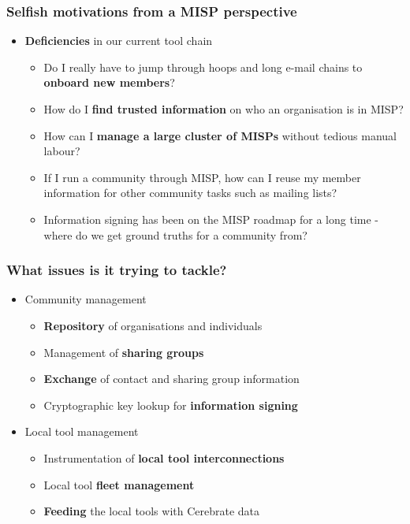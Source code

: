 \begin{frame}
	\frametitle{Selfish motivations from a MISP perspective}
	\begin{itemize}
            \item {\bf Deficiencies} in our current tool chain
            \begin{itemize}
                \item Do I really have to jump through hoops and long e-mail chains to {\bf onboard new members}?
                \item How do I {\bf find trusted information} on who an organisation is in MISP?
                \item How can I {\bf manage a large cluster of MISPs} without tedious manual labour?
                \item If I run a community through MISP, how can I reuse my member information for other community tasks such as mailing lists?
                \item Information signing has been on the MISP roadmap for a long time - where do we get ground truths for a community from?
            \end{itemize}
        \end{itemize}
\end{frame}

\begin{frame}
	\frametitle{What issues is it trying to tackle?}
	\begin{itemize}
                \item Community management
		\begin{itemize}
                    \item {\bf Repository} of organisations and individuals
                    \item Management of {\bf sharing groups}
                    \item {\bf Exchange} of contact and sharing group information
                    \item Cryptographic key lookup for {\bf information signing}
		\end{itemize}
                \item Local tool management
		\begin{itemize}
                    \item Instrumentation of {\bf local tool interconnections}
                    \item Local tool {\bf fleet management}
                    \item {\bf Feeding} the local tools with Cerebrate data
                \end{itemize}
	\end{itemize}
\end{frame}


